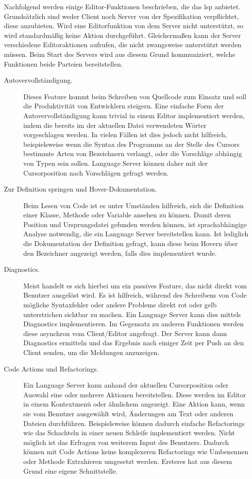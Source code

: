 Nachfolgend werden einige Editor-Funktionen beschrieben, die das \ac{lsp} anbietet.
Grundsätzlich sind weder Client noch Server von der Spezifikation verpflichtet, diese anzubieten.
Wird eine Editorfunktion von dem Server nicht unterstützt, so wird standardmäßig keine Aktion durchgeführt.\cite{lsp-overview}
Gleichermaßen kann der Server verschiedene Editoraktionen aufrufen, die nicht zwangsweise unterstützt werden müssen.
Beim Start des Servers wird aus diesem Grund kommuniziert, welche Funktionen beide Parteien bereitstellen.\cite[Initialize Request]{lsp-spec}

\begin{description}
    \item[Autovervollständigung.]
    Dieses Feature kommt beim Schreiben von Quellcode zum Einsatz und soll die Produktivität von Entwicklern steigern.
    Eine einfache Form der Autovervollständigung kann trivial in einem Editor implementiert werden, indem die bereits im der aktuellen Datei verwendeten Wörter vorgeschlagen werden.
    In vielen Fällen ist dies jedoch nicht hilfreich, beispielsweise wenn die Syntax des Programms an der Stelle des Cursors bestimmte Arten von Bezeichnern verlangt, oder die Vorschläge abhängig von Typen sein sollen.
    Language Server können daher mit der Cursorposition nach Vorschlägen gefragt werden.
    \item[Zur Definition springen und Hover-Dokumentation.]
    Beim Lesen von Code ist es unter Umständen hilfreich, sich die Definition einer Klasse, Methode oder Variable ansehen zu können.
    Damit deren Position und Ursprungsdatei gefunden werden können, ist sprachabhängige Analyse notwendig, die ein Language Server bereitstellen kann.
    Ist lediglich die Dokumentation der Definition gefragt, kann diese beim Hovern über den Bezeichner angezeigt werden, falls dies implementiert wurde.
    \item[Diagnostics.]
    Meist handelt es sich hierbei um ein passives Feature, das nicht direkt vom Benutzer ausgelöst wird.
    Es ist hilfreich, während des Schreibens von Code mögliche Syntaxfehler oder andere Probleme direkt rot oder gelb unterstrichen sichtbar zu machen.
    Ein Language Server kann dies mittels Diagnostics implementieren.
    Im Gegensatz zu anderen Funktionen werden diese asynchron vom Client/Editor angefragt.
    Der Server kann dann Diagnostics ermitteln und das Ergebnis nach einiger Zeit per Push an den Client senden, um die Meldungen anzuzeigen.
    \item[Code Actions und Refactorings.]
    Ein Language Server kann anhand der aktuellen Cursorposition oder Auswahl eine oder mehrere Aktionen bereitstellen.
    Diese werden im Editor in einem Kontextmenü oder ähnlichem angezeigt.
    Eine Aktion kann, wenn sie vom Benutzer ausgewählt wird, Änderungen am Text oder anderen Dateien durchführen.
    Beispielsweise können dadurch einfache Refactorings wie das Schachteln in einer neuen Schleife implementiert werden.
    Nicht möglich ist das Erfragen von weiterem Input des Benutzers.
    Dadurch können mit Code Actions keine komplexeren Refactorings wie Umbenennen oder Methode Extrahieren umgesetzt werden.
    Ersteres hat aus diesem Grund eine eigene Schnittstelle.
\end{description}

